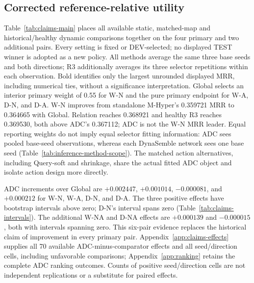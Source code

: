 \documentclass[11pt,a4paper]{article}
\begin{document}
\subsection{Corrected reference-relative utility}
\label{sec:main-results}
Table~\ref{tab:claims-main} places all available static, matched-map and historical/healthy dynamic comparisons together on the four primary and two additional pairs. Every setting is fixed or DEV-selected; no displayed TEST winner is adopted as a new policy. All methods average the same three base seeds and both directions; R3 additionally averages its three selector repetitions within each observation. Bold identifies only the largest unrounded displayed MRR, including numerical ties, without a significance interpretation. Global selects an interior primary weight of 0.55 for W-N and the pure primary endpoint for W-A, D-N, and D-A. W-N improves from standalone M-Hyper's 0.359721 MRR to 0.364665 with Global. Relation reaches 0.368921 and healthy R3 reaches 0.369530, both above ADC's 0.367112; ADC is not the W-N MRR leader.
Equal reporting weights do not imply equal selector fitting information: ADC sees pooled base-seed observations, whereas each DynaSemble network sees one base seed (Table~\ref{tab:inference-method-scope}). The matched action alternatives, including Query-soft and shrinkage, share the actual fitted ADC object and isolate action design more directly.

ADC increments over Global are $+0.002447$, $+0.001014$, $-0.000081$, and $+0.000212$ for W-N, W-A, D-N, and D-A. The three positive effects have bootstrap intervals above zero; D-N's interval spans zero (Table~\ref{tab:claims-intervals}). The additional W-NA and D-NA effects are $+0.000139$ and $-0.000015$, both with intervals spanning zero. This six-pair evidence replaces the historical claim of improvement in every primary pair. Appendix~\ref{app:claims-effects} supplies all 70 available ADC-minus-comparator effects and all seed/direction cells, including unfavorable comparisons; Appendix~\ref{app:ranking} retains the complete ADC ranking outcomes. Counts of positive seed/direction cells are not independent replications or a substitute for paired effects.
\end{document}
